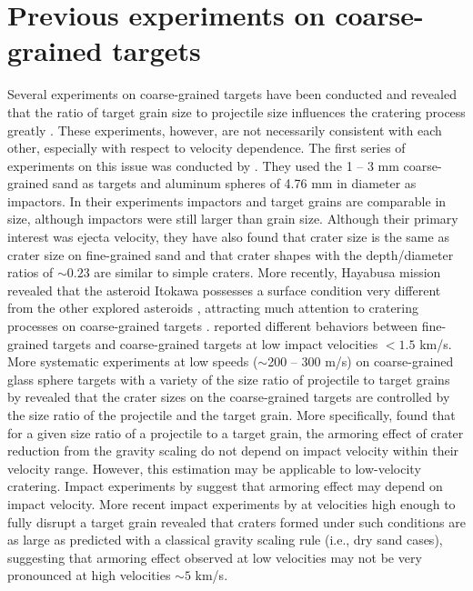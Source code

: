 \documentclass[3p,authoryear]{elsarticle}
\begin{document}
\section{Previous experiments on coarse-grained targets} \label{sec:review}
Several experiments on coarse-grained targets have been conducted and revealed that the ratio of target grain size to projectile size influences the cratering process greatly \citep{cintala1999, barnouin2005, guettler2012, holsapple2014}.
These experiments, however, are not necessarily consistent with each other, especially with respect to velocity dependence.
The first series of experiments on this issue was conducted by \citet{cintala1999}. They used the 1 -- 3 mm coarse-grained sand as targets and aluminum spheres of 4.76 mm in diameter as impactors. In their experiments impactors and target grains are comparable in size, although impactors were still larger than grain size.
Although their primary interest was ejecta velocity, they have also found that crater size is the same as crater size on fine-grained sand and that crater shapes with the depth/diameter ratios of $\sim 0.23$ are similar to simple craters.
More recently, Hayabusa mission revealed that the asteroid Itokawa possesses a surface condition very different from the other explored asteroids \citep[e.g.][]{fujiwara2006,saito2006}, attracting much attention to cratering processes on coarse-grained targets \citep{barnouin2011, guettler2012, holsapple2014}.
\citet{barnouin2011} reported different behaviors between fine-grained targets and coarse-grained targets at low impact velocities $<1.5$ km/s.
More systematic experiments at low speeds ($\sim$200 -- 300 m/s) on coarse-grained glass sphere targets with a variety of the size ratio of projectile to target grains by \citet{guettler2012} revealed that  the crater sizes on the coarse-grained targets are controlled by the size ratio of the projectile and the target grain.
More specifically, \citet{guettler2012} found that for a given size ratio of a projectile to a target grain, the armoring effect of crater reduction from the gravity scaling do not depend on impact velocity within their velocity range.
However, this estimation may be applicable to low-velocity cratering. Impact experiments by \citet{barnouin2011} suggest that armoring effect may depend on impact velocity.
More recent impact experiments by \citet{holsapple2014} at velocities high enough to fully disrupt a target grain revealed that craters formed under such conditions are as large as predicted with a  classical gravity scaling rule (i.e., dry sand cases), suggesting that armoring effect observed at low velocities may not be very pronounced at high velocities $\sim 5$ km/s.
\end{document}
